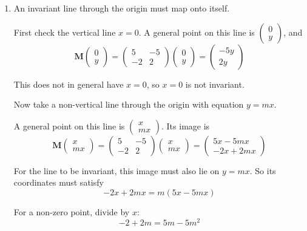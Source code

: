 \documentclass[leqno]{article}
\begin{document}
\begin{enumerate}[
  label=\textbf{\arabic*.},
  leftmargin=*,
  topsep=0pt,
  partopsep=0pt,
  parsep=0pt
]
\begin{djsSolution}
\begin{enumerate}[label=\textbf{(\alph*)}]
  Hence \(p=3\) or \(p=-4\).

  \item An invariant line through the origin must map onto itself.

  First check the vertical line \(x=0\). A general point on this line is \(\begin{pmatrix}0\\y\end{pmatrix}\), and
  \[
  \mathbf{M}\begin{pmatrix}0\\y\end{pmatrix}
  =
  \begin{pmatrix}
  5 & -5\\
  -2 & 2
  \end{pmatrix}
  \begin{pmatrix}0\\y\end{pmatrix}
  =
  \begin{pmatrix}-5y\\2y\end{pmatrix}
  \]

  This does not in general have \(x=0\), so \(x=0\) is not invariant.

  Now take a non-vertical line through the origin with equation \(y=mx\).

  A general point on this line is \(\begin{pmatrix}x\\mx\end{pmatrix}\). Its image is
  \[
  \mathbf{M}\begin{pmatrix}x\\mx\end{pmatrix}
  =
  \begin{pmatrix}
  5 & -5\\
  -2 & 2
  \end{pmatrix}
  \begin{pmatrix}x\\mx\end{pmatrix}
  =
  \begin{pmatrix}
  5x-5mx\\
  -2x+2mx
  \end{pmatrix}
  \]

  For the line to be invariant, this image must also lie on \(y=mx\). So its coordinates must satisfy
  \[
  -2x+2mx = m(5x-5mx)
  \]

  For a non-zero point, divide by \(x\):
  \[
  -2+2m = 5m-5m^2
  \]


\end{enumerate}
\end{djsSolution}
\end{enumerate}
\end{document}
